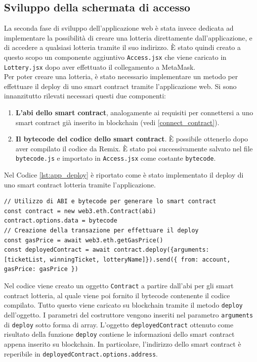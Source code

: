 \documentclass[12pt,a4paper,openright,twoside]{report}
\begin{document}
\subsection{Sviluppo della schermata di accesso}
La seconda fase di sviluppo dell'applicazione web è stata invece dedicata ad implementare la possibilità di creare una lotteria direttamente dall'applicazione, e di accedere a qualsiasi lotteria tramite il suo indirizzo. È stato quindi creato a questo scopo un componente aggiuntivo \texttt{Access.jsx} che viene caricato in \texttt{Lottery.jsx} dopo aver effettuato il collegamento a MetaMask.\\
Per poter creare una lotteria, è stato necessario implementare un metodo per effettuare il deploy di uno smart contract tramite l'applicazione web. Si sono innanzitutto rilevati necessari questi due componenti:
\begin{enumerate}[font=\bfseries]
    \item \textbf{L'\acrshort{abi} dello smart contract}, analogamente ai requisiti per connettersi a uno smart contract già inserito in blockchain (vedi \ref{connect_contract}).
    \item \textbf{Il bytecode del codice dello smart contract}. È possibile ottenerlo dopo aver compilato il codice da Remix. È stato poi successivamente salvato nel file \texttt{bytecode.js} e importato in \texttt{Access.jsx} come costante \texttt{bytecode}.
\end{enumerate}
Nel Codice \ref{lst:app_deploy} è riportato come è stato implementato il deploy di uno smart contract lotteria tramite l'applicazione.
\begin{lstlisting}[language=JSX, caption=Deploy di Smart Contract da applicazione web, label={lst:app_deploy}]
// Utilizzo di ABI e bytecode per generare lo smart contract
const contract = new web3.eth.Contract(abi)
contract.options.data = bytecode
// Creazione della transazione per effettuare il deploy
const gasPrice = await web3.eth.getGasPrice()
const deployedContract = await contract.deploy({arguments: [ticketList, winningTicket, lotteryName]}).send({ from: account, gasPrice: gasPrice })
\end{lstlisting}
Nel codice viene creato un oggetto \texttt{Contract} a partire dall'\acrshort{abi} per gli smart contract lotteria, al quale viene poi fornito il bytecode contenente il codice compilato. Tutto questo viene caricato su blockchain tramite il metodo \texttt{deploy} dell'oggetto. I parametri del costruttore vengono inseriti nel parametro \texttt{arguments} di \texttt{deploy} sotto forma di array. L'oggetto \texttt{deployedContract} ottenuto come risultato della funzione \texttt{deploy} contiene le informazioni dello smart contract appena inserito su blockchain. In particolare, l'indirizzo dello smart contract è reperibile in \texttt{deployedContract.options.address}.\\
\end{document}
